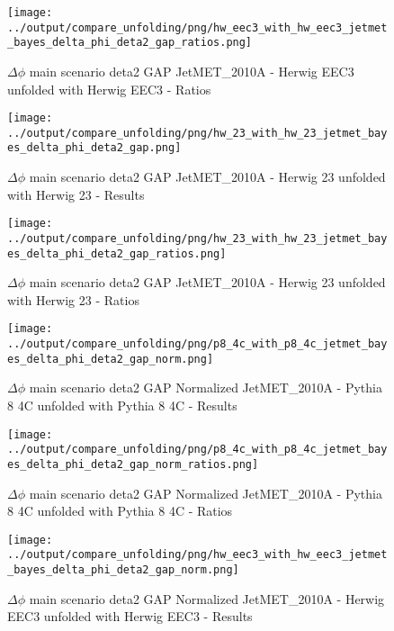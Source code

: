 \documentclass[11pt]{book}
\begin{document}
\begin{figure}[ht]
\centering
\texttt{[image: ../output/compare\_unfolding/png/hw\_eec3\_with\_hw\_eec3\_jetmet\_bayes\_delta\_phi\_deta2\_gap\_ratios.png]}
\caption{$\Delta\phi$ main scenario deta2 GAP JetMET\_2010A - Herwig EEC3 unfolded with Herwig EEC3 - Ratios}
\label{hw_eec3_hw_eec3_jetmet_bayes_delta_phi_deta2_gap_b}
\end{figure}

\begin{figure}[ht]
\centering
\texttt{[image: ../output/compare\_unfolding/png/hw\_23\_with\_hw\_23\_jetmet\_bayes\_delta\_phi\_deta2\_gap.png]}
\caption{$\Delta\phi$ main scenario deta2 GAP JetMET\_2010A - Herwig 23 unfolded with Herwig 23 - Results}
\label{hw_23_hw_23_jetmet_bayes_delta_phi_deta2_gap_a}
\end{figure}

\begin{figure}[ht]
\centering
\texttt{[image: ../output/compare\_unfolding/png/hw\_23\_with\_hw\_23\_jetmet\_bayes\_delta\_phi\_deta2\_gap\_ratios.png]}
\caption{$\Delta\phi$ main scenario deta2 GAP JetMET\_2010A - Herwig 23 unfolded with Herwig 23 - Ratios}
\label{hw_23_hw_23_jetmet_bayes_delta_phi_deta2_gap_b}
\end{figure}

\begin{figure}[ht]
\centering
\texttt{[image: ../output/compare\_unfolding/png/p8\_4c\_with\_p8\_4c\_jetmet\_bayes\_delta\_phi\_deta2\_gap\_norm.png]}
\caption{$\Delta\phi$ main scenario deta2 GAP Normalized JetMET\_2010A - Pythia 8 4C unfolded with Pythia 8 4C - Results}
\label{p8_p8_jetmet_bayes_delta_phi_deta2_gap_norm_a}
\end{figure}

\begin{figure}[ht]
\centering
\texttt{[image: ../output/compare\_unfolding/png/p8\_4c\_with\_p8\_4c\_jetmet\_bayes\_delta\_phi\_deta2\_gap\_norm\_ratios.png]}
\caption{$\Delta\phi$ main scenario deta2 GAP Normalized JetMET\_2010A - Pythia 8 4C unfolded with Pythia 8 4C - Ratios}
\label{p8_p8_jetmet_bayes_delta_phi_deta2_gap_norm_b}
\end{figure}

\begin{figure}[ht]
\centering
\texttt{[image: ../output/compare\_unfolding/png/hw\_eec3\_with\_hw\_eec3\_jetmet\_bayes\_delta\_phi\_deta2\_gap\_norm.png]}
\caption{$\Delta\phi$ main scenario deta2 GAP Normalized JetMET\_2010A - Herwig EEC3 unfolded with Herwig EEC3 - Results}
\label{hw_eec3_hw_eec3_jetmet_bayes_delta_phi_deta2_gap_norm_a}
\end{figure}
\end{document}
